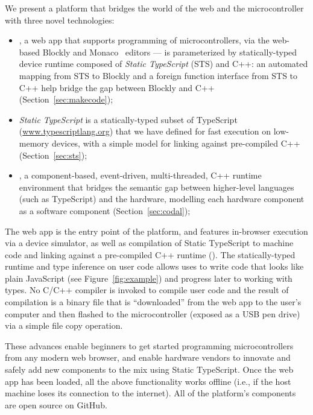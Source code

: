 We present a platform that bridges the world of the web and the microcontroller with three
novel technologies:
\begin{itemize}
\item \emph{\MCN}, a web app that supports programming of microcontrollers, via the web-based Blockly
and Monaco~\cite{Monaco} editors ---
\MC is parameterized by statically-typed device runtime composed of \emph{Static TypeScript} (STS) and C++:
an automated mapping from STS to Blockly and a foreign function interface from STS to C++ help
bridge the gap between Blockly and C++ (Section~\ref{sec:makecode});

\item \emph{Static TypeScript} is a statically-typed subset of TypeScript
(\url{www.typescriptlang.org}) that we have defined for fast execution on low-memory devices,
with a simple model for linking against pre-compiled C++ (Section~\ref{sec:sts});

\item \emph{\CO}, a component-based, event-driven, multi-threaded, C++ runtime environment
that bridges the semantic gap between higher-level languages (such as TypeScript) and the hardware,
modelling each hardware component as a software component (Section~\ref{sec:codal});

\end{itemize}
The \MC web app is the entry point of the platform, and features
in-browser execution via a device simulator,
as well as compilation of Static TypeScript to machine code and linking against a pre-compiled C++ runtime (\emph{\CON}).
The statically-typed runtime and type inference on user code allows uses to write code
that looks like plain JavaScript (see Figure~\ref{fig:example}) and progress later to working
with types.
No C/C++ compiler is invoked to compile user code and the result of compilation is a
binary file that is ``downloaded'' from the web app to the user's
computer and then flashed to the microcontroller (exposed as a USB pen drive)
via a simple file copy operation.

These advances enable beginners to get started programming microcontrollers from
any modern web browser, and enable hardware vendors to innovate and safely add new
components to the mix using Static TypeScript.
Once the web app has been loaded, all the above functionality works offline
(i.e., if the host machine loses its connection
to the internet). All of the platform's components are open source on GitHub.

